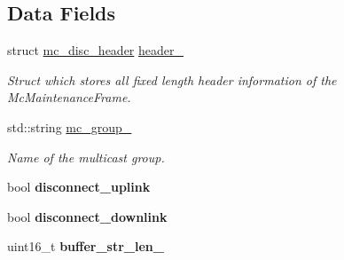 \subsection*{Data Fields}
\begin{DoxyCompactItemize}
\item 
\hypertarget{classMcDisconnectFrame_a18b0d697ab048db2933e240ccb8a0170}{struct \hyperlink{structmc__disc__header}{mc\-\_\-disc\-\_\-header} \hyperlink{classMcDisconnectFrame_a18b0d697ab048db2933e240ccb8a0170}{header\-\_\-}}\label{classMcDisconnectFrame_a18b0d697ab048db2933e240ccb8a0170}

\begin{DoxyCompactList}\small\item\em Struct which stores all fixed length header information of the Mc\-Maintenance\-Frame. \end{DoxyCompactList}\item 
\hypertarget{classMcDisconnectFrame_a87158666f709b829c6f0caf98c6e93a6}{std\-::string \hyperlink{classMcDisconnectFrame_a87158666f709b829c6f0caf98c6e93a6}{mc\-\_\-group\-\_\-}}\label{classMcDisconnectFrame_a87158666f709b829c6f0caf98c6e93a6}

\begin{DoxyCompactList}\small\item\em Name of the multicast group. \end{DoxyCompactList}\item 
\hypertarget{classMcDisconnectFrame_a1f06fd2c58ef0ed917f15a94427169f5}{bool {\bfseries disconnect\-\_\-uplink}}\label{classMcDisconnectFrame_a1f06fd2c58ef0ed917f15a94427169f5}

\item 
\hypertarget{classMcDisconnectFrame_a0487a23e5bc81fcb6b7ab854878ba828}{bool {\bfseries disconnect\-\_\-downlink}}\label{classMcDisconnectFrame_a0487a23e5bc81fcb6b7ab854878ba828}

\item 
\hypertarget{classMcDisconnectFrame_a3b4b8161f55c6f52fb280eb7c63e0ae8}{uint16\-\_\-t {\bfseries buffer\-\_\-str\-\_\-len\-\_\-}}\label{classMcDisconnectFrame_a3b4b8161f55c6f52fb280eb7c63e0ae8}

\end{DoxyCompactItemize}
